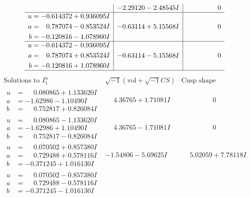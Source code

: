 \documentclass[1p]{elsarticle_modified}
\theoremstyle{definition}
\newcommand{\I}{\sqrt{-1}}
\begin{document}
$$\begin{array}{c|c|c}
 & -2.29120 - 2.48545 I & \phantom{-0.000000 } 0 \\ \hline\begin{aligned}
u &= -0.614372 + 0.936095 I \\
a &= \phantom{-}0.787074 - 0.853524 I \\
b &= -0.120816 - 1.078960 I\end{aligned}
 & -0.63114 + 5.15568 I & \phantom{-0.000000 } 0 \\ \hline\begin{aligned}
u &= -0.614372 - 0.936095 I \\
a &= \phantom{-}0.787074 + 0.853524 I \\
b &= -0.120816 + 1.078960 I\end{aligned}
 & -0.63114 - 5.15568 I & \phantom{-0.000000 } 0\\
 \hline 
 \end{array}$$\newpage$$\begin{array}{c|c|c}  
\text{Solutions to }I^u_{1}& \I (\text{vol} + \sqrt{-1}CS) & \text{Cusp shape}\\
 \hline 
\begin{aligned}
u &= \phantom{-}0.080865 + 1.133620 I \\
a &= -1.62986 - 1.10490 I \\
b &= \phantom{-}0.752817 + 0.826084 I\end{aligned}
 & \phantom{-}4.36765 + 1.71081 I & \phantom{-0.000000 } 0 \\ \hline\begin{aligned}
u &= \phantom{-}0.080865 - 1.133620 I \\
a &= -1.62986 + 1.10490 I \\
b &= \phantom{-}0.752817 - 0.826084 I\end{aligned}
 & \phantom{-}4.36765 - 1.71081 I & \phantom{-0.000000 } 0 \\ \hline\begin{aligned}
u &= \phantom{-}0.070502 + 0.857380 I \\
a &= \phantom{-}0.729488 + 0.578116 I \\
b &= -0.371245 + 1.016130 I\end{aligned}
 & -1.54806 - 5.69625 I & \phantom{-}5.02059 + 7.78118 I \\ \hline\begin{aligned}
u &= \phantom{-}0.070502 - 0.857380 I \\
a &= \phantom{-}0.729488 - 0.578116 I \\
b &= -0.371245 - 1.016130 I\end{aligned}

\end{array}$$
\end{document}
